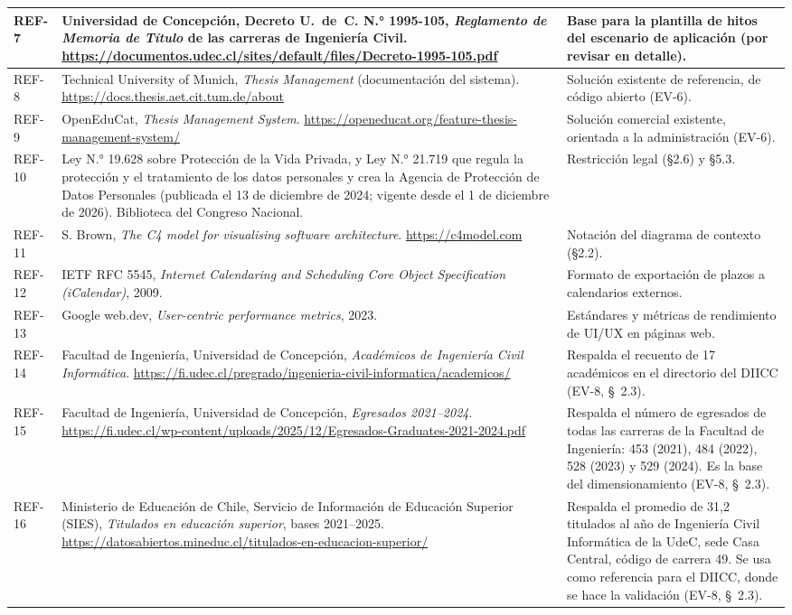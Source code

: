 \documentclass[10pt,a4paper]{article}
\begin{document}
\begin{xltabular}{\linewidth}{|P{1.6cm}|L|P{5.5cm}|}
REF-7 & Universidad de Concepción, Decreto U.~de~C. N.° 1995-105, \emph{Reglamento de Memoria de Título} de las carreras de Ingeniería Civil. \url{https://documentos.udec.cl/sites/default/files/Decreto-1995-105.pdf} & Base para la plantilla de hitos del escenario de aplicación (por revisar en detalle). \\ \hline
REF-8 & Technical University of Munich, \emph{Thesis Management} (documentación del sistema). \url{https://docs.thesis.aet.cit.tum.de/about} & Solución existente de referencia, de código abierto (EV-6). \\ \hline
REF-9 & OpenEduCat, \emph{Thesis Management System}. \url{https://openeducat.org/feature-thesis-management-system/} & Solución comercial existente, orientada a la administración (EV-6). \\ \hline
REF-10 & Ley N.° 19.628 sobre Protección de la Vida Privada, y Ley N.° 21.719 que regula la protección y el tratamiento de los datos personales y crea la Agencia de Protección de Datos Personales (publicada el 13 de diciembre de 2024; vigente desde el 1 de diciembre de 2026). Biblioteca del Congreso Nacional. & Restricción legal (§2.6) y §5.3. \\ \hline
REF-11 & S. Brown, \emph{The C4 model for visualising software architecture}. \url{https://c4model.com} & Notación del diagrama de contexto (§2.2). \\ \hline
REF-12 & IETF RFC 5545, \emph{Internet Calendaring and Scheduling Core Object Specification (iCalendar)}, 2009. & Formato de exportación de plazos a calendarios externos. \\ \hline
REF-13 & Google web.dev, \emph{User-centric performance metrics}, 2023. & Estándares y métricas de rendimiento de UI/UX en páginas web. \\ \hline
REF-14 & Facultad de Ingeniería, Universidad de Concepción, \emph{Académicos de Ingeniería Civil Informática}. \url{https://fi.udec.cl/pregrado/ingenieria-civil-informatica/academicos/} & Respalda el recuento de 17 académicos en el directorio del DIICC (EV-8, \S~2.3). \\ \hline
REF-15 & Facultad de Ingeniería, Universidad de Concepción, \emph{Egresados 2021--2024}. \url{https://fi.udec.cl/wp-content/uploads/2025/12/Egresados-Graduates-2021-2024.pdf} & Respalda el número de egresados de todas las carreras de la Facultad de Ingeniería: 453 (2021), 484 (2022), 528 (2023) y 529 (2024). Es la base del dimensionamiento (EV-8, \S~2.3). \\ \hline
REF-16 & Ministerio de Educación de Chile, Servicio de Información de Educación Superior (SIES), \emph{Titulados en educación superior}, bases 2021--2025. \url{https://datosabiertos.mineduc.cl/titulados-en-educacion-superior/} & Respalda el promedio de 31,2 titulados al año de Ingeniería Civil Informática de la UdeC, sede Casa Central, código de carrera 49. Se usa como referencia para el DIICC, donde se hace la validación (EV-8, \S~2.3). \\ \hline

\end{xltabular}
\end{document}
